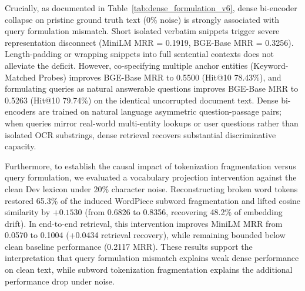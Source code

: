 \documentclass[conference]{IEEEtran}
\begin{document}
Crucially, as documented in Table~\ref{tab:dense_formulation_v6}, dense bi-encoder collapse on pristine ground truth text ($0\%$ noise) is strongly associated with query formulation mismatch. Short isolated verbatim snippets trigger severe representation disconnect (MiniLM MRR = 0.1919, BGE-Base MRR = 0.3256). Length-padding or wrapping snippets into full sentential contexts does not alleviate the deficit. However, co-specifying multiple anchor entities (Keyword-Matched Probes) improves BGE-Base MRR to 0.5500 (Hit@10 78.43\%), and formulating queries as natural answerable questions improves BGE-Base MRR to 0.5263 (Hit@10 79.74\%) on the identical uncorrupted document text. Dense bi-encoders are trained on natural language asymmetric question-passage pairs; when queries mirror real-world multi-entity lookups or user questions rather than isolated OCR substrings, dense retrieval recovers substantial discriminative capacity.

Furthermore, to establish the causal impact of tokenization fragmentation versus query formulation, we evaluated a vocabulary projection intervention against the clean Dev lexicon under 20\% character noise. Reconstructing broken word tokens restored 65.3\% of the induced WordPiece subword fragmentation and lifted cosine similarity by $+0.1530$ (from 0.6826 to 0.8356, recovering 48.2\% of embedding drift). In end-to-end retrieval, this intervention improves MiniLM MRR from 0.0570 to 0.1004 (+0.0434 retrieval recovery), while remaining bounded below clean baseline performance (0.2117 MRR). These results support the interpretation that query formulation mismatch explains weak dense performance on clean text, while subword tokenization fragmentation explains the additional performance drop under noise.

\begin{table}[t]
\centering\small
\caption{Dense bi-encoder sensitivity on the clean ground-truth short-probe subset ($0\%$ noise, $N=306$); the regime-grid chunked result and truncation-control results are separately identified in the text and \texttt{results/v8/dense\_reconciliation\_v8.csv}.}\label{tab:dense_formulation_v6}
\end{table}
\end{document}
